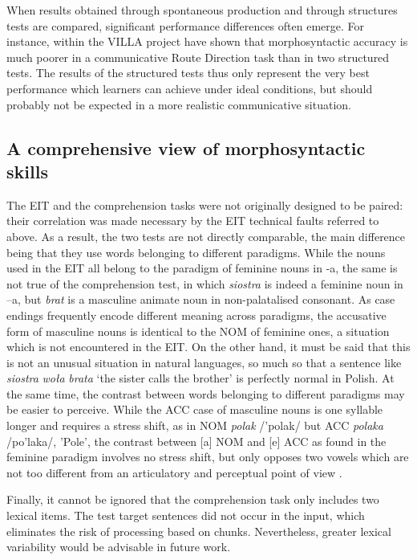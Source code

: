When results obtained through spontaneous production and through structures tests are compared, significant performance differences often emerge. For instance, within the VILLA project \citet{WatorekEtAl2016} have shown that morphosyntactic accuracy is much poorer in a communicative Route Direction task than in two structured tests. The results of the structured tests thus only represent the very best performance which learners can achieve under ideal conditions, but should probably not be expected in a more realistic communicative situation.

\subsection{A comprehensive view of morphosyntactic skills}\label{sec:08:6.3}

The EIT and the comprehension tasks were not originally designed to be paired: their correlation was made necessary by the EIT technical faults referred to above. As a result, the two tests are not directly comparable, the main difference being that they use words belonging to different paradigms. While the nouns used in the EIT all belong to the paradigm of feminine nouns in -a, the same is not true of the comprehension test, in which \textit{siostra} is indeed a feminine noun in –a, but \textit{brat} is a masculine animate noun in non-palatalised consonant. As case endings frequently encode different meaning across paradigms, the accusative form of masculine nouns is identical to the NOM of feminine ones, a situation which is not encountered in the EIT. On the other hand, it must be said that this is not an unusual situation in natural languages, so much so that a sentence like \textit{siostra} \textit{woła} \textit{brata} ‘the sister calls the brother’ is perfectly normal in Polish. At the same time, the contrast between words belonging to different paradigms may be easier to perceive. While the ACC case of masculine nouns is one syllable longer and requires a stress shift, as in NOM \textit{polak} /'polak/ but ACC \textit{polaka} /po'laka/, 'Pole', the contrast between [a] NOM and [e] ACC as found in the feminine paradigm involves no stress shift, but only opposes two vowels which are not too different from an articulatory and perceptual point of view \citep{SisinniEtAl2013}.

Finally, it cannot be ignored that the comprehension task only includes two lexical items. The test target sentences did not occur in the input, which eliminates the risk of processing based on chunks. Nevertheless, greater lexical variability would be advisable in future work.
